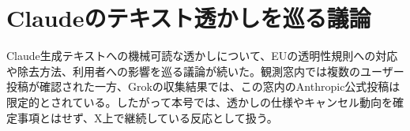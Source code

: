 \section{Claudeのテキスト透かしを巡る議論}
Claude生成テキストへの機械可読な透かしについて、EUの透明性規則への対応や除去方法、利用者への影響を巡る議論が続いた。観測窓内では複数のユーザー投稿が確認された一方、Grokの収集結果では、この窓内のAnthropic公式投稿は限定的とされている。したがって本号では、透かしの仕様やキャンセル動向を確定事項とはせず、X上で継続している反応として扱う。
